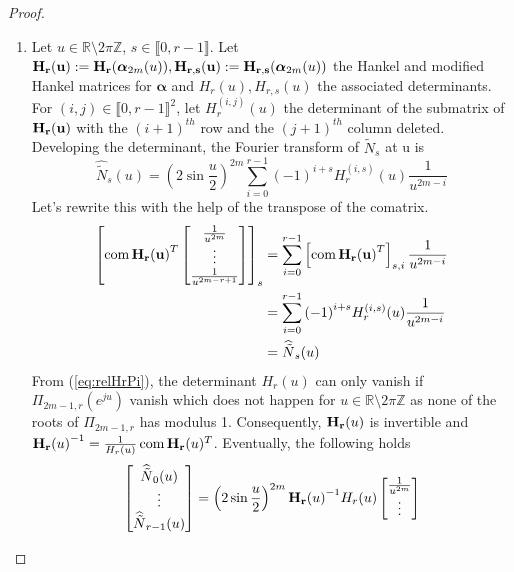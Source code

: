 \begin{proof}
\begin{enumerate}
    \item  Let $u \in  \mathbb{R}\setminus{2\pi\mathbb{Z}}$, $s \in \llbracket0,r-1\rrbracket$. Let $\mathbf{H_r(u)} := 
      \mathbf{H_r}({\bm{\alpha}}_{2m}(u)), \mathbf{H_{r,s}(u)} := \mathbf{H_{r,s}}({\bm{\alpha}}_{2m}(u))$ the Hankel and 
      modified Hankel matrices for $\bm{\alpha}$ and $H_{r}(u), H_{r,s}(u)$ the associated determinants.  For $(i,j) \in 
      {\llbracket0,r-1\rrbracket}^2$, let $H^{(i,j)}_r(u)$ the determinant of the submatrix of $\mathbf{H_r(u)}$ with the 
      $(i+1)^{th}$ row and the $(j+1)^{th}$ column deleted.  Developing the determinant, the Fourier transform of 
      $\tilde{N}_{s}$ at u is
      \begin{equation*}
	\widehat{\tilde{N}}_s(u) =\left(2\sin \frac{u}{2}\right)^{2m} \sum_{i=0}^{r-1} {(-1)}^{i+s} H_r^{(i,s)}(u) 
	\frac{1}{u^{2m-i}}
      \end{equation*}
      Let's rewrite this with the help of the transpose of the comatrix.
      \begin{align*}
	\left[\operatorname*{com} \mathbf{H_r(u)}^T \begin{bmatrix} \frac{1}{u^{2m}} \\ \vdots \\ \frac{1}{u^{2m-r+1}} 
	\end{bmatrix}\right]_s &= \sum_{i=0}^{r-1} \left[\operatorname*{com} \mathbf{H_r(u)}^T\right]_{s,i} \frac{1}{u^{2m-i}} \\
	&= \sum_{i=0}^{r-1} {(-1)}^{i+s} H_r^{(i,s)}(u) \frac{1}{u^{2m-i}} \\
	&= \widehat{\tilde{N}}_s(u)
    \end{align*}
    From (\ref{eq:relHrPi}), the determinant $H_r(u)$ can only vanish if $\Pi_{2m-1,r}(e^{ju})$ vanish which does not 
    happen for $u \in  \mathbb{R}\setminus{2\pi\mathbb{Z}}$ as none of the roots of $\Pi_{2m-1,r}$ has modulus 1.  
    Consequently, $\mathbf{H_r}(u)$ is invertible and ${\mathbf{H_r}(u)}^{-1} = \frac{1}{H_r(u)} \operatorname*{com} \mathbf{H_r}(u)^T$.  
    Eventually, the following holds
    \begin{equation*}
      \begin{bmatrix} \widehat{\tilde{N}}_0(u) \\ \vdots \\ \widehat{\tilde{N}}_{r-1}(u) \end{bmatrix} = \left(2\sin 
      \frac{u}{2}\right)^{2m} {\mathbf{H_r}(u)}^{-1} H_r(u) \begin{bmatrix} \frac{1}{u^{2m}} \\ \vdots \\ 

\end{bmatrix}
\end{equation*}
\end{enumerate}
\end{proof}

